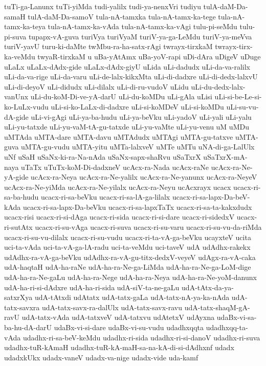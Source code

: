 {tuTi-ga-Lanunx
tuTi-yiMda
tudi-yalilx
tudi-ya-nenxVri
tudiyu
tulA-daM-Da-samaH
tulA-daM-Da-samoV
tula-nA-tamxka
tula-nA-tamx-ka-tege
tula-nA-tamx-ka-teya
tula-nA-tamx-ka-vAda
tula-nA-tamx-ka-vAgi
tulu-pi-seMdu
tulu-pi-suva
tupapx-vA-guva
turiVya
turiVyaM
turiV-ya-ga-LeMdu
turiV-ya-meVva
turiV-yavU
turu-ki-daMte
twMbu-ra-ha-satx-rAgi
twrayx-tirxkaM
twrayx-tirx-ka-veMdu
twyaR-tirxkaM
u
uBa-yAtAmx
uBa-yoV-rapi
uDi-dAra
uDigeV
uDuge
uLaLx
uLaLx-dAdx-gide
uLaLx-dAdx-giyU
uLida
uLi-dadudx
uLi-da-va-ralilx
uLi-da-va-rige
uLi-da-varu
uLi-de-lalx-kikxMta
uLi-di-dadxre
uLi-di-dedx-lalxvU
uLi-di-deyoV
uLi-didudx
uLi-dilalx
uLi-di-ru-vudoV
uLidu
uLi-du-dedx-lalx-vanUnx
uLi-du-koM-Di-ve-yA-darU
uLi-du-koMDu
uLi-gAla
uLisi
uLi-si-be-Le-si-ko-LuLx-vudu
uLi-si-ko-LaLx-di-dadxre
uLi-si-koMDeV
uLi-si-koMDu
uLi-su-vu-dA-gide
uLi-vi-gAgi
uLi-ya-ba-hudu
uLi-ya-beVku
uLi-yadoV
uLi-yali
uLi-yalu
uLi-yu-tatxde
uLi-yu-vaM-tA-gu-tatxde
uLi-yu-vaMte
uLi-yu-venu
uM
uMDu
uMTAda
uMTA-dare
uMTA-davu
uMTAdudx
uMTAgi
uMTA-gu-tatxve
uMTA-guva
uMTA-gu-vudu
uMTA-yitu
uMTa-lalxveV
uMTe
uMTu
uNA-di-ga-LalUlx
uNf
uSaH
uSaNx-ki-ra-Na-nAda
uSaNx-sapx-shaRvu
uSaTxrX
uSaTxrX-mA-naya
uTaTx
uTuTx-koM-Di-dadxneV
ucAcx-ra-Nada
ucAcx-raNe
ucAcx-ra-Ne-yA-gide
ucAcx-ra-Neya
ucAcx-ra-Ne-yalilx
ucAcx-ra-Ne-yanunx
ucAcx-ra-NeyeV
ucAcx-ra-Ne-yiMda
ucAcx-ra-Ne-yilalx
ucAcx-ra-Neyu
ucAcxrayx
ucacx
ucacx-ri-sa-ba-hudu
ucacx-ri-sa-beVku
ucacx-ri-sa-lA-ga-lilalx
ucacx-ri-sa-lapx-Da-beV-kAda
ucacx-ri-sa-lapx-Da-beVku
ucacx-ri-sa-lapxTaTx
ucacx-ri-sa-ta-kakxdudx
ucacx-risi
ucacx-ri-si-dAga
ucacx-ri-sida
ucacx-ri-si-dare
ucacx-ri-sidedxV
ucacx-ri-sutAtx
ucacx-ri-su-vAga
ucacx-ri-suva
ucacx-ri-su-varu
ucacx-ri-su-vu-da-riMda
ucacx-ri-su-vu-dilalx
ucacx-ri-su-vudu
ucacx-ri-ta-vA-ga-beVku
ucayxteV
ucita
uci-ta-vAda
uci-ta-vA-ga-lA-radu
uci-ta-veMdu
uci-taveV
udA
udAdhx-rakekx
udAdhx-ra-vA-ga-beVku
udAdhx-ra-vA-gu-titx-dedxV-veyeV
udAgx-ra-vA-caka
udA-haqtaH
udA-ha-raNe
udA-ha-ra-Ne-ga-LiMda
udA-ha-ra-Ne-ga-LoM-dige
udA-ha-ra-Ne-gaLu
udA-ha-ra-Nege
udA-ha-ra-Neya
udA-ha-ra-Ne-yoM-danunx
udA-ha-ri-si-dAdxre
udA-ha-ri-sida
udA-siV-ta-ne-gaLu
udA-tAtx-da-ya-satxrXya
udA-tAtxdi
udAtatx
udA-tatx-gaLa
udA-tatx-nA-ya-ka-nAda
udA-tatx-savxra
udA-tatx-savx-ra-dalUlx
udA-tatx-savx-ravu
udA-tatx-shaqM-gA-ravU
udA-tatx-vAda
udA-tatxveV
udA-tatxvu
udAtetxV
udAyxna
udaBx-vi-sa-ba-hu-dA-darU
udaBx-vi-si-dare
udaBx-vi-su-vudu
udadhxqqta
udadhxqq-ta-vAda
udadhx-ri-sa-beV-keMdu
udadhx-ri-sida
udadhx-ri-si-danoV
udadhx-ri-suva
udadhx-tuR-kAmaH
udadhx-tuR-kA-maH-sa-na-kA-di-si-dAdhxnf
udadx
udadxkUkx
udadx-vaneV
udadx-va-nige
udadx-vide
uda-kamf
}
